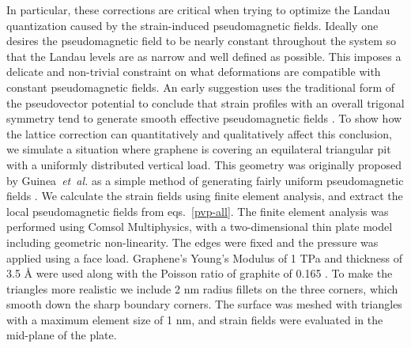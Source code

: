 In particular, these corrections are critical when trying to optimize the Landau quantization caused by the strain-induced pseudomagnetic fields.
Ideally one desires the pseudomagnetic field to be nearly constant throughout the system so that the Landau levels are as narrow and well defined as possible.
This imposes a delicate and non-trivial constraint on what deformations are compatible with constant pseudomagnetic fields.
An early suggestion uses the traditional form of the pseudovector potential to conclude that strain profiles with an overall trigonal symmetry tend to generate smooth effective pseudomagnetic fields \cite{Guinea2009}.
To show how the lattice correction can quantitatively and qualitatively affect this conclusion, we simulate a situation where graphene is covering an equilateral triangular pit with a uniformly distributed vertical load.
This geometry was originally proposed by Guinea~\emph{et~al.} as a simple method of generating fairly uniform pseudomagnetic fields \cite{Guinea2009}.
We calculate the strain fields using finite element analysis, and extract the local pseudomagnetic fields from eqs.~\eqref{pvp-all}.
The finite element analysis was performed using Comsol Multiphysics, with a two-dimensional thin plate model including geometric non-linearity.
The edges were fixed and the pressure was applied using a face load.
Graphene's Young's Modulus of 1 TPa and thickness of 3.5 \AA \cite{Lee2008} were used along with the Poisson ratio of graphite of 0.165 \cite{Blakslee1970}.
To make the triangles more realistic we include 2 nm radius fillets on the three corners, which smooth down the sharp boundary corners.
The surface was meshed with triangles with a maximum element size of 1 nm, and strain fields were evaluated in the mid-plane of the plate.

